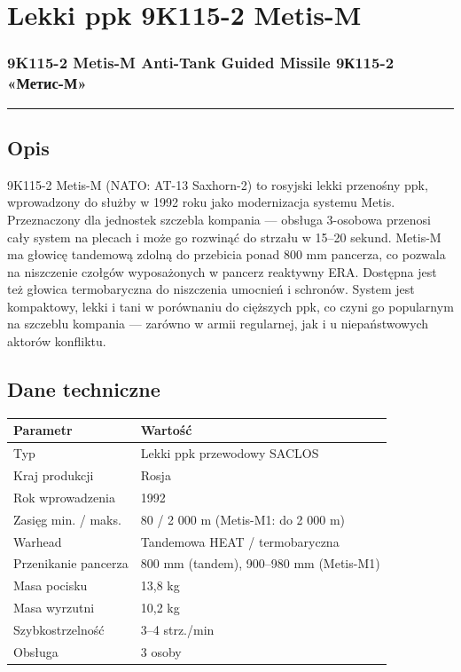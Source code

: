 \documentclass[12pt,oneside]{book}
\begin{document}
\section{Lekki ppk 9K115-2 Metis-M}\label{lekki-ppk-9k115-2-metis-m}

\subsubsection{9K115-2 Metis-M Anti-Tank Guided Missile \textbar{}
9К115-2
«Метис-М»}\label{k115-2-metis-m-anti-tank-guided-missile-9ux43a115-2-ux43cux435ux442ux438ux441-ux43c}

\begin{center}\rule{0.5\linewidth}{0.5pt}\end{center}

\subsection{Opis}\label{opis-52}

9K115-2 Metis-M (NATO: AT-13 Saxhorn-2) to rosyjski lekki przenośny ppk,
wprowadzony do służby w 1992 roku jako modernizacja systemu Metis.
Przeznaczony dla jednostek szczebla kompania --- obsługa 3-osobowa
przenosi cały system na plecach i może go rozwinąć do strzału w 15--20
sekund. Metis-M ma głowicę tandemową zdolną do przebicia ponad 800 mm
pancerza, co pozwala na niszczenie czołgów wyposażonych w pancerz
reaktywny ERA. Dostępna jest też głowica termobaryczna do niszczenia
umocnień i schronów. System jest kompaktowy, lekki i tani w porównaniu
do cięższych ppk, co czyni go popularnym na szczeblu kompania ---
zarówno w armii regularnej, jak i u niepaństwowych aktorów konfliktu.

\subsection{Dane techniczne}\label{dane-techniczne-52}

\begin{longtable}[]{@{}ll@{}}
\toprule\noalign{}
Parametr & Wartość \\
\midrule\noalign{}
\endhead
\bottomrule\noalign{}
\endlastfoot
Typ & Lekki ppk przewodowy SACLOS \\
Kraj produkcji & Rosja \\
Rok wprowadzenia & 1992 \\
Zasięg min. / maks. & 80 / 2 000 m (Metis-M1: do 2 000 m) \\
Warhead & Tandemowa HEAT / termobaryczna \\
Przenikanie pancerza & 800 mm (tandem), 900--980 mm (Metis-M1) \\
Masa pocisku & 13,8 kg \\
Masa wyrzutni & 10,2 kg \\
Szybkostrzelność & 3--4 strz./min \\
Obsługa & 3 osoby \\
\end{longtable}
\end{document}
